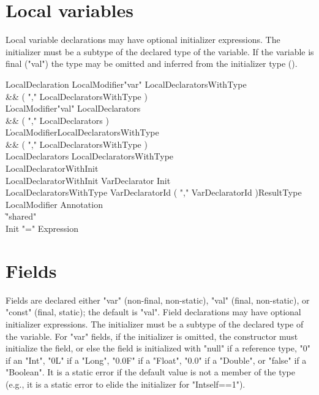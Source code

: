 \section{Local variables}
Local variable declarations may have optional
initializer expressions.  The initializer must be a subtype of
the declared type of the variable.  If the variable is final
(\xcd"val")
the type may be omitted and
inferred from the initializer type ().

\begin{grammar}
LocalDeclaration
        \: LocalModifier\star \xcd"var" LocalDeclaratorsWithType \\&& ( \xcd"," LocalDeclaratorsWithType )\star \\
        \| LocalModifier\star \xcd"val" LocalDeclarators \\&& ( \xcd"," LocalDeclarators )\star \\
        \| LocalModifier\star LocalDeclaratorsWithType \\&& ( \xcd"," LocalDeclaratorsWithType )\star \\
LocalDeclarators
        \: LocalDeclaratorsWithType \\
        \: LocalDeclaratorWithInit \\
LocalDeclaratorWithInit
        \: VarDeclarator Init \\
LocalDeclaratorsWithType
        \: VarDeclaratorId
                ( \xcd"," VarDeclaratorId )\star ResultType \\
LocalModifier \: Annotation \\
              \| \xcd"shared" \\
Init \: \xcd"=" Expression \\
\end{grammar}

\section{Fields}
Fields are declared either \xcd"var" (non-final, non-static),
\xcd"val" (final, non-static), or \xcd"const" (final, static);
the default is \xcd"val".
Field declarations may have optional
initializer expressions.  The initializer must be a subtype of
the declared type of the variable.
For \xcd"var" fields,
if the initializer is omitted, the constructor must initialize
the field, or else the field is initialized with
\xcd"null" if a reference type, \xcd"0" if an \xcd"Int", \xcd"0L"
if a \xcd"Long",
\xcd"0.0F" if a \xcd"Float", \xcd"0.0" if a \xcd"Double", or
\xcd"false" if a \xcd"Boolean".  It is a static error if the
default value is not a member of the type (e.g., it is a static
error to elide the initializer for \xcd"Int{self==1}").

